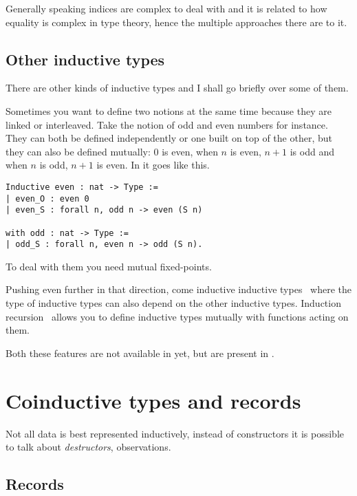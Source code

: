 Generally speaking indices are complex to deal with and it is related to how
equality is complex in type theory, hence the multiple approaches there are to
it.

\subsection{Other inductive types}

There are other kinds of inductive types and I shall go briefly over some of
them.


Sometimes you want to define two notions at the same time because they are
linked or interleaved.
Take the notion of odd and even numbers for instance. They can both be defined
independently or one built on top of the other, but they can also be defined
mutually: \(0\) is even, when \(n\) is even, \(n+1\) is odd and when \(n\)
is odd, \(n+1\) is even.
In \Coq it goes like this.
\begin{verbatim}
Inductive even : nat -> Type :=
| even_O : even 0
| even_S : forall n, odd n -> even (S n)

with odd : nat -> Type :=
| odd_S : forall n, even n -> odd (S n).
\end{verbatim}

To deal with them you need mutual fixed-points.


Pushing even further in that direction, come inductive inductive
types~ where the type of inductive types
can also depend on the other inductive types.
Induction recursion~ allows you to define
inductive types mutually with functions acting on them.

Both these features are not available in \Coq yet, but are present in \Agda.

\section{Coinductive types and records}

Not all data is best represented inductively, instead of constructors it is
possible to talk about \emph{destructors}, \ie observations.

\subsection{Records}

